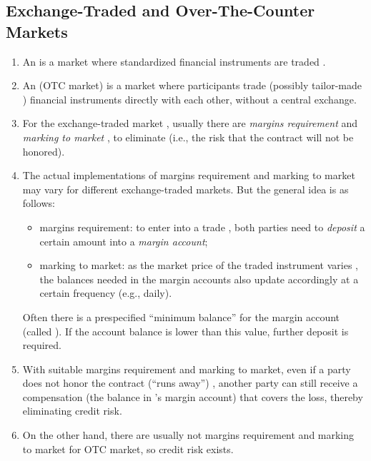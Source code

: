 \subsection{Exchange-Traded and Over-The-Counter Markets}
\begin{enumerate}
\item An   is a market
where standardized financial instruments  are traded
.

\item An  (OTC market)  is
a market where participants  trade (possibly tailor-made
) financial instruments  directly with each
other, without a central exchange.

\item For the exchange-traded market , usually there are
\emph{margins requirement}  and \emph{marking to market}
, to eliminate   (i.e., the risk
that the contract  will not be honored).

\item The actual implementations of margins requirement  and
marking to market may vary for different exchange-traded markets. But the
general idea is as follows:
\begin{itemize}
\item margins requirement: to enter into a trade ,
both parties need to \emph{deposit}  a certain amount into a
\emph{margin account};
\item marking to market: as the market price  of the traded
instrument varies , the balances needed in the margin
accounts also update accordingly at a certain frequency (e.g., daily).
\end{itemize}
\begin{note}
Often there is a prespecified ``minimum balance'' for the margin account
(called ). If the account balance is lower than this
value, further deposit  is required.
\end{note}

\item With suitable margins requirement and marking to market, even if a party
 does not honor the contract (``runs away'') ,
another party can still receive a compensation (the balance in 's
margin account) that covers the loss, thereby eliminating credit risk.

\item On the other hand, there are usually not margins requirement and marking
to market for OTC market, so credit risk exists.
\end{enumerate}

